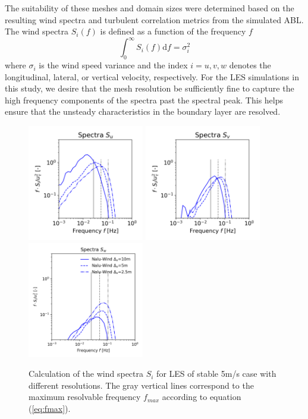 The suitability of these meshes and domain sizes were determined based
on the resulting wind spectra and turbulent correlation metrics from
the simulated ABL. The wind spectra $S_i(f)$ is defined as a function
of the frequency $f$
\begin{equation}
  \int_0^\infty S_i(f) \textrm{d}f = \sigma_i^2
\end{equation}
where $\sigma_i$ is the wind speed variance and the index $i=u,v,w$
denotes the longitudinal, lateral, or vertical velocity, respectively.
For the LES simulations in this study, we desire that the mesh
resolution be sufficiently fine to capture the high frequency
components of the spectra past the spectral peak.  This helps ensure
that the unsteady characteristics in the boundary layer are resolved.


\begin{figure}%
  \centering
  \includegraphics[width=2.0in]{figures/GridStudy_Spectra_Su.png}
  \includegraphics[width=2.0in]{figures/GridStudy_Spectra_Sv.png}
  \includegraphics[width=2.0in]{figures/GridStudy_Spectra_Sw.png}
  \caption{   \label{fig:GridStudySpectra}
    Calculation of the wind spectra $S_i$ for LES of stable
    5m/s case with different resolutions.  The gray vertical lines
    correspond to the maximum resolvable frequency $f_{max}$ according
    to equation (\ref{eq:fmax}). }
\end{figure}

